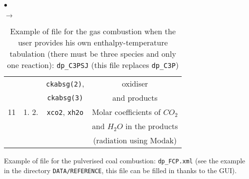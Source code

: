 {{\begin{list}{$\bullet$}{}
\begin{list}{$\rightarrow$}{}
\begin{table}[htbp]
\begin{center}
{\begin{tabular}{|c|c|c|c|}
        &                                   &                  \texttt{ckabsg(2)}, & oxidiser                                    \\
        &                                   &                  \texttt{ckabsg(3)}  & and products                                \\ \hline
  11    &    1.       2.                    & \texttt{xco2\index{xco2}},   \texttt{xh2o\index{xh2o}}& Molar coefficients of $CO_2$         \\
        &                                   &                             & and $H_2O$ in the products                  \\
        &                                   &                             & (radiation using Modak)                     \\ \hline
\end{tabular}
}
\caption{Example of file for the gas combustion when the user provides
 his own enthalpy-temperature tabulation
                     (there must be three species and only one
                     reaction): \texttt{dp\_C3PSJ} (this file replaces
 \texttt{dp\_C3P})}\label{tab:dpC3PSJ}
\end{center}
\end{table}
        \end{list}

       \item Example of file for the pulverised coal combustion:
             \texttt{dp\_FCP.xml} (see the example in the directory \texttt{DATA/REFERENCE},
             this file can be filled in thanks to the GUI).


\end{list}}}

